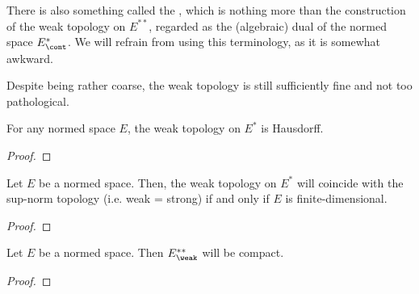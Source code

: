         \begin{convention}
            There is also something called the , which is nothing more than the construction of the weak topology on $E^{**}$, regarded as the (algebraic) dual of the normed space $E^*_{\cont}$. We will refrain from using this terminology, as it is somewhat awkward.
        \end{convention}
        Despite being rather coarse, the weak topology is still sufficiently fine and not too pathological.
        \begin{lemma} \label{lemma: weak_topology_is_hausdorff}
            For any normed space $E$, the weak topology on $E^*$ is Hausdorff.
        \end{lemma}
            \begin{proof}
            \end{proof}
        \begin{theorem} \label{theorem: finite_dimensional_weak_duality}
            Let $E$ be a normed space. Then, the weak topology on $E^*$ will coincide with the sup-norm topology (i.e. weak = strong) if and only if $E$ is finite-dimensional.
        \end{theorem}
            \begin{proof}
                
            \end{proof}
        \begin{theorem} \label{theorem: banach_alaoglu}
            Let $E$ be a normed space. Then $E^{**}_{\weak}$ will be compact.
        \end{theorem}
            \begin{proof}
                
            \end{proof}